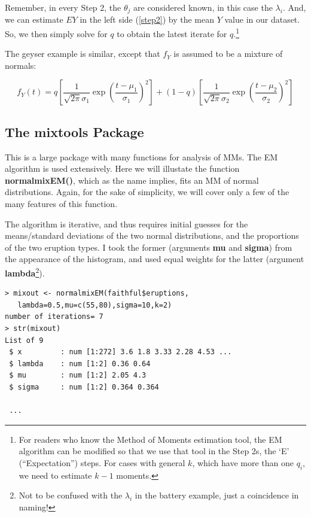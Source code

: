 \documentclass[11pt]{article}
\begin{document}
Remember, in every Step 2, the $\theta_j$ are considered known, in this
case the $\lambda_i$.  And, we can estimate $EY$ in the left side
(\ref{step2}) by the mean $Y$ value in our dataset.  So, we then simply
solve for $q$ to obtain the latest iterate for $q$.\footnote{For readers
who know the Method of Moments estimation tool, the EM algorithm can be
modified so that we use that tool in the Step 2s, the `E'
(``Expectation'') steps.  For cases with general $k$, which have more
than one $q_i$, we need to estimate $k-1$ moments.}

The geyser example is similar, except that $f_Y$ is assumed to be a
mixture of normals:

\begin{equation}
f_Y(t) = 
q \left [ \frac{1}{\sqrt{2\pi} \sigma_1}
\exp \left ( \frac{t-\mu_1}{\sigma_1} \right)^2 \right ] + 
(1-q) \left [ \frac{1}{\sqrt{2\pi} \sigma_2}
\exp \left ( \frac{t-\mu_2}{\sigma_2} \right)^2 \right ]
\end{equation}

\subsection{The mixtools Package}

This is a large package with many functions for analysis of MMs.  The EM
algorithm is used extensively.  Here we will illustate the function
\textbf{normalmixEM()}, which as the name implies, fits an MM of normal
distributions.  Again, for the sake of simplicity, we will cover only a
few of the many features of this function.

The algorithm is iterative, and thus requires initial guesses for the
means/standard deviations of the two normal distributions, and the
proportions of the two eruption types.  I took the former (arguments
\textbf{mu} and \textbf{sigma}) from the appearance of the histogram,
and used equal weights for the latter (argument
\textbf{lambda}\footnote{Not to be confused with the $\lambda_i$ in the
battery example, just a coincidence in naming!}).

\begin{lstlisting}
> mixout <- normalmixEM(faithful$eruptions,
   lambda=0.5,mu=c(55,80),sigma=10,k=2) 
number of iterations= 7
> str(mixout)
List of 9
 $ x         : num [1:272] 3.6 1.8 3.33 2.28 4.53 ...
 $ lambda    : num [1:2] 0.36 0.64
 $ mu        : num [1:2] 2.05 4.3
 $ sigma     : num [1:2] 0.364 0.364

 ...
\end{lstlisting}
\end{document}
